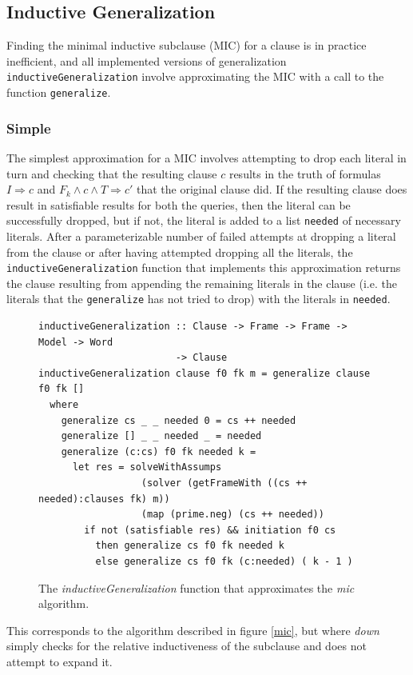 \documentclass[12pt,a4paper,twoside,openright]{report}
\begin{document}
{\subsection{Inductive Generalization}
Finding the minimal inductive subclause (MIC) for a clause is in practice inefficient,
and all implemented versions of generalization
\verb,inductiveGeneralization, involve approximating the MIC with a call to the function
\verb,generalize,.

\subsubsection{Simple}
The simplest approximation for a MIC involves attempting to drop each literal in turn and checking
that the resulting clause $c$ results in the truth of formulas $I \Rightarrow c$ and
$F_k \wedge c \wedge T \Rightarrow c'$ that the original clause did. If the resulting clause
does result in satisfiable results for both the queries, then the literal can be successfully dropped,
but if not, the literal is added to a list \verb,needed, of necessary literals.
After a parameterizable number of failed attempts at dropping a literal from the clause or after
having attempted dropping all the literals, the
\verb,inductiveGeneralization, function that implements this approximation
returns the clause resulting from appending the remaining
literals in the clause (i.e. the literals that the \verb,generalize, has not tried to drop)
with the literals in \verb,needed,.

\begin{figure}[!Ht]
\centering
\begin{verbatim}
inductiveGeneralization :: Clause -> Frame -> Frame -> Model -> Word
                        -> Clause
inductiveGeneralization clause f0 fk m = generalize clause f0 fk []
  where
    generalize cs _ _ needed 0 = cs ++ needed
    generalize [] _ _ needed _ = needed
    generalize (c:cs) f0 fk needed k = 
      let res = solveWithAssumps
                  (solver (getFrameWith ((cs ++ needed):clauses fk) m))
                  (map (prime.neg) (cs ++ needed))
        if not (satisfiable res) && initiation f0 cs
          then generalize cs f0 fk needed k
          else generalize cs f0 fk (c:needed) ( k - 1 ) 
\end{verbatim}
\caption{The {\it inductiveGeneralization} function that approximates the {\it mic} algorithm.}
\end{figure}

This corresponds to the algorithm described in figure \ref{mic}, but where {\it down} simply
checks for the relative inductiveness of the subclause and does not attempt to expand it.

}
\end{document}
